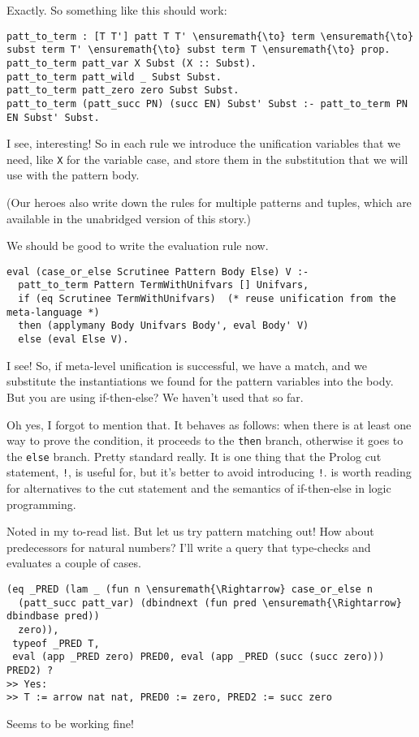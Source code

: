 \heroADVISOR{} Exactly. So something like this should work:

\begin{verbatim}
patt_to_term : [T T'] patt T T' \ensuremath{\to} term \ensuremath{\to} subst term T' \ensuremath{\to} subst term T \ensuremath{\to} prop.
patt_to_term patt_var X Subst (X :: Subst).
patt_to_term patt_wild _ Subst Subst.
patt_to_term patt_zero zero Subst Subst.
patt_to_term (patt_succ PN) (succ EN) Subst' Subst :- patt_to_term PN EN Subst' Subst.
\end{verbatim}

\heroSTUDENT{} I see, interesting! So in each rule we introduce the
unification variables that we need, like \texttt{X} for the variable
case, and store them in the substitution that we will use with the
pattern body.

\begin{scenecomment}
(Our heroes also write down the rules for multiple patterns and tuples, which are
available in the unabridged version of this story.)
\end{scenecomment}

\heroADVISOR{} We should be good to write the evaluation rule now.

\begin{verbatim}
eval (case_or_else Scrutinee Pattern Body Else) V :-
  patt_to_term Pattern TermWithUnifvars [] Unifvars,
  if (eq Scrutinee TermWithUnifvars)  (* reuse unification from the meta-language *)
  then (applymany Body Unifvars Body', eval Body' V)
  else (eval Else V).
\end{verbatim}

\heroSTUDENT{} I see! So, if meta-level unification is successful, we have a
match, and we substitute the instantiations we found for the pattern
variables into the body. But you are using if-then-else? We haven't used
that so far.

\heroADVISOR{} Oh yes, I forgot to mention that. It behaves as follows: when
there is at least one way to prove the condition, it proceeds to the
\texttt{then} branch, otherwise it goes to the \texttt{else} branch.
Pretty standard really. It is one thing that the Prolog cut statement,
\texttt{!}, is useful for, but it's better to avoid introducing
\texttt{!}. \citet{kiselyov05backtracking} is worth reading for
alternatives to the cut statement and the semantics of if-then-else in
logic programming.

\heroSTUDENT{} Noted in my to-read list. But let us try pattern matching out!
How about predecessors for natural numbers? I'll write a query that
type-checks and evaluates a couple of cases.

\begin{verbatim}
(eq _PRED (lam _ (fun n \ensuremath{\Rightarrow} case_or_else n
  (patt_succ patt_var) (dbindnext (fun pred \ensuremath{\Rightarrow} dbindbase pred))
  zero)),
 typeof _PRED T,
 eval (app _PRED zero) PRED0, eval (app _PRED (succ (succ zero))) PRED2) ?
>> Yes:
>> T := arrow nat nat, PRED0 := zero, PRED2 := succ zero
\end{verbatim}

\heroADVISOR{} Seems to be working fine!
